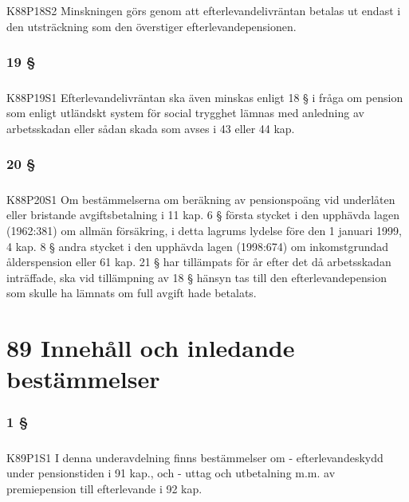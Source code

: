 \documentclass[a4paper,notitlepage,openany,10pt]{book}
\begin{document}
\paragraph*{}
{\tiny K88P18S2}
Minskningen görs genom att efterlevandelivräntan betalas ut endast i den utsträckning som den överstiger efterlevandepensionen.
\subsection*{19 §}
\paragraph*{}
{\tiny K88P19S1}
Efterlevandelivräntan ska även minskas enligt 18 § i fråga om pension som enligt utländskt system för social trygghet lämnas med anledning av arbetsskadan eller sådan skada som avses i 43 eller 44 kap.
\subsection*{20 §}
\paragraph*{}
{\tiny K88P20S1}
Om bestämmelserna om beräkning av pensionspoäng vid underlåten eller bristande avgiftsbetalning i 11 kap. 6 § första stycket i den upphävda lagen (1962:381) om allmän försäkring, i detta lagrums lydelse före den 1 januari 1999, 4 kap. 8 § andra stycket i den upphävda lagen (1998:674) om inkomstgrundad ålderspension eller 61 kap. 21 § har tillämpats för år efter det då arbetsskadan inträffade, ska vid tillämpning av 18 § hänsyn tas till den efterlevandepension som skulle ha lämnats om full avgift hade betalats.
\chapter*{89 Innehåll och inledande bestämmelser}
\subsection*{1 §}
\paragraph*{}
{\tiny K89P1S1}
I denna underavdelning finns bestämmelser om
\newline - efterlevandeskydd under pensionstiden i 91 kap., och
\newline - uttag och utbetalning m.m. av premiepension till efterlevande i 92 kap.
\end{document}
